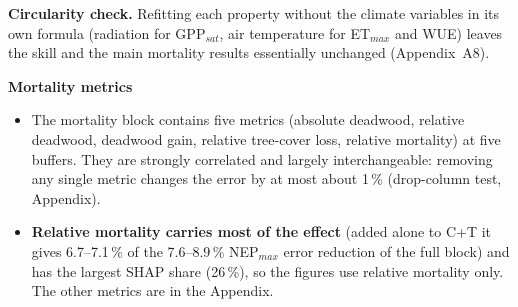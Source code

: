 \textbf{Circularity check.} Refitting each property without the climate variables in its own formula (radiation for GPP$_{sat}$, air temperature for ET$_{max}$ and WUE) leaves the skill and the main mortality results essentially unchanged (Appendix~A8).

\textbf{Mortality metrics}
\begin{itemize}
  \item The mortality block contains five metrics (absolute deadwood, relative deadwood, deadwood gain, relative
        tree-cover loss, relative mortality) at five buffers. They are strongly correlated and largely interchangeable:
        removing any single metric changes the error by at most about 1\,\% (drop-column test, Appendix).
  \item \textbf{Relative mortality carries most of the effect} (added alone to C+T it gives 6.7--7.1\,\% of the 7.6--8.9\,\%
        NEP$_{max}$ error reduction of the full block) and has the largest SHAP share (26\,\%), so the figures use relative
        mortality only. The other metrics are in the Appendix.
\end{itemize}

